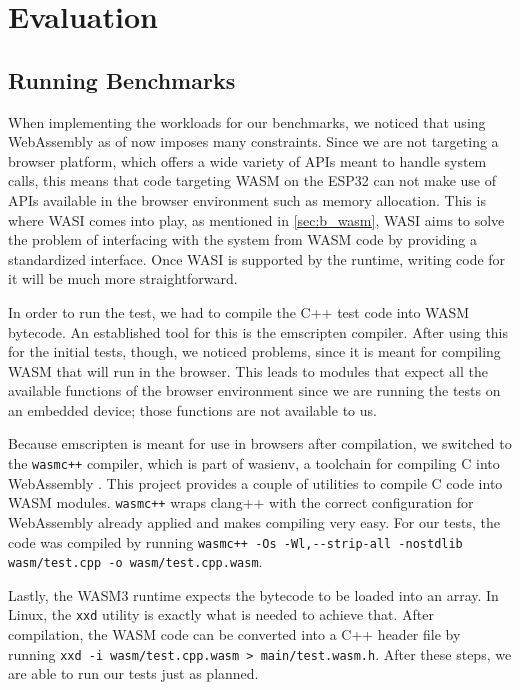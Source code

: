 
\chapter{Evaluation}\label{chapter:evaluation}

\section{Running Benchmarks}

When implementing the workloads for our benchmarks, we noticed that using WebAssembly as of now imposes many constraints. Since we are not targeting a browser platform, which offers a wide variety of APIs meant to handle system calls, this means that code targeting WASM on the ESP32 can not make use of APIs available in the browser environment such as memory allocation. This is where WASI comes into play, as mentioned in \ref{sec:b_wasm}, WASI aims to solve the problem of interfacing with the system from WASM code by providing a standardized interface. Once WASI is supported by the runtime, writing code for it will be much more straightforward.

In order to run the test, we had to compile the C++ test code into WASM bytecode. An established tool for this is the emscripten compiler. After using this for the initial tests, though, we noticed problems, since it is meant for compiling WASM that will run in the browser. This leads to modules that expect all the available functions of the browser environment since we are running the tests on an embedded device; those functions are not available to us.

\begin{sloppypar}
Because emscripten is meant for use in browsers after compilation, we switched to the \lstinline{wasmc++} compiler, which is part of wasienv, a toolchain for compiling C into WebAssembly \autocite{noauthor_wasienvwasienv_2020}. This project provides a couple of utilities to compile C code into WASM modules. \lstinline{wasmc++} wraps clang++ with the correct configuration for WebAssembly already applied and makes compiling very easy. For our tests, the code was compiled by running \lstinline{wasmc++ -Os -Wl,--strip-all -nostdlib wasm/test.cpp -o wasm/test.cpp.wasm}.
\end{sloppypar}

\begin{sloppypar}
Lastly, the WASM3 runtime expects the bytecode to be loaded into an array. In Linux, the \lstinline{xxd} utility is exactly what is needed to achieve that. After compilation, the WASM code can be converted into a C++ header file by running \lstinline{xxd -i wasm/test.cpp.wasm > main/test.wasm.h}. After these steps, we are able to run our tests just as planned.
\end{sloppypar}

